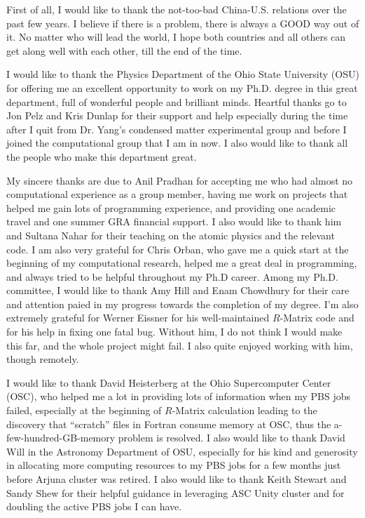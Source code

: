 \begin{acknowledgments}
	First of all, I would like to thank the not-too-bad China-U.S. relations over the past few years. I believe if there is a problem, there is always a GOOD way out of it. No matter who will lead the world, I hope both countries and all others can get along well with each other, till the end of the time.
	
	I would like to thank the Physics Department of the Ohio State University (OSU) for offering me an excellent opportunity to work on my Ph.D. degree in this great department, full of wonderful people and brilliant minds. Heartful thanks go to Jon Pelz and Kris Dunlap for their support and help especially during the time after I quit from Dr. Yang's condensed matter experimental group and before I joined the computational group that I am in now. I also would like to thank all the people who make this department great.
	
	My sincere thanks are due to Anil Pradhan for accepting me who had almost no computational experience as a group member, having me work on projects that helped me gain lots of programming experience, and providing one academic travel and one summer GRA financial support. I also would like to thank him and Sultana Nahar for their teaching on the atomic physics and the relevant code. I am also very grateful for Chris Orban, who gave me a quick start at the beginning of my computational research, helped me a great deal in programming, and always tried to be helpful throughout my Ph.D career. Among my Ph.D. committee, I would like to thank Amy Hill and Enam Chowdhury for their care and attention paied in my progress towards the completion of my degree. I'm also extremely grateful for Werner Eissner for his well-maintained $R$-Matrix code and for his help in fixing one fatal bug. Without him, I do not think I would make this far, and the whole project might fail. I also quite enjoyed working with him, though remotely.
	
	I would like to thank David Heisterberg at the Ohio Supercomputer Center (OSC), who helped me a lot in providing lots of information when my PBS jobs failed, especially at the beginning of $R$-Matrix calculation leading to the discovery that ``scratch'' files in Fortran consume memory at OSC, thus the a-few-hundred-GB-memory problem is resolved. I also would like to thank David Will in the Astronomy Department of OSU, especially for his kind and generosity in allocating more computing resources to my PBS jobs for a few months just before Arjuna cluster was retired. I also would like to thank Keith Stewart and Sandy Shew for their helpful guidance in leveraging ASC Unity cluster and for doubling the active PBS jobs I can have.
	

\end{acknowledgments}
